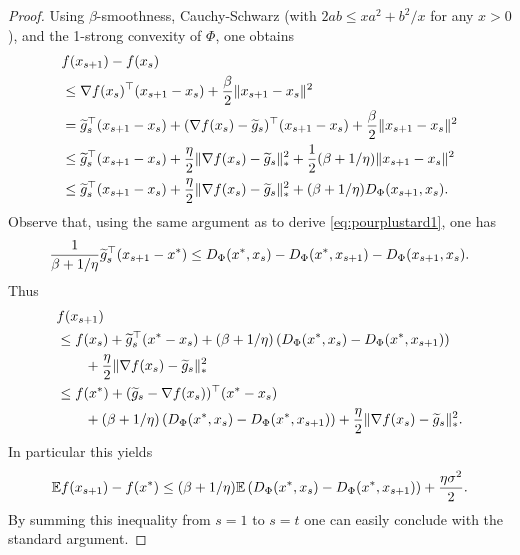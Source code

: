\begin{proof}
Using $\beta$-smoothness, Cauchy-Schwarz (with $2 ab \leq x a^2+ b^2 / x$ for any $x >0$), and the 1-strong convexity of $\Phi$, one obtains
\begin{align*}
& f(x_{s+1}) - f(x_s) \\
& \leq \nabla f(x_s)^{\top} (x_{s+1} - x_s) + \frac{\beta}{2} \|x_{s+1} - x_s\|^2 \\
& = \widetilde{g}_s^{\top} (x_{s+1} - x_s) + (\nabla f(x_s) - \widetilde{g}_s)^{\top} (x_{s+1} - x_s) + \frac{\beta}{2} \|x_{s+1} - x_s\|^2 \\
& \leq \widetilde{g}_s^{\top} (x_{s+1} - x_s) + \frac{\eta}{2} \|\nabla f(x_s) - \widetilde{g}_s\|_*^2 + \frac12 (\beta + 1/\eta) \|x_{s+1} - x_s\|^2 \\
& \leq \widetilde{g}_s^{\top} (x_{s+1} - x_s) + \frac{\eta}{2} \|\nabla f(x_s) - \widetilde{g}_s\|_*^2 + (\beta + 1/\eta) D_{\Phi}(x_{s+1}, x_s) .
\end{align*}
Observe that, using the same argument as to derive \eqref{eq:pourplustard1}, one has
$$\frac{1}{\beta + 1/\eta} \widetilde{g}_s^{\top} (x_{s+1} - x^*) \leq D_{\Phi} (x^*, x_s) - D_{\Phi}(x^*, x_{s+1}) - D_{\Phi}(x_{s+1}, x_s) .$$
Thus
\begin{align*}
& f(x_{s+1}) \\
 & \leq f(x_s) + \widetilde{g}_s^{\top}(x^* - x_s) + (\beta + 1/\eta) \left(D_{\Phi} (x^*, x_s) - D_{\Phi}(x^*, x_{s+1})\right) \\
& \qquad + \frac{\eta}{2} \|\nabla f(x_s) - \widetilde{g}_s\|_*^2 \\
& \leq f(x^*) + (\widetilde{g}_s-\nabla f(x_s))^{\top}(x^* - x_s) \\
& \qquad + (\beta + 1/\eta) \left(D_{\Phi} (x^*, x_s) - D_{\Phi}(x^*, x_{s+1})\right) + \frac{\eta}{2} \|\nabla f(x_s) - \widetilde{g}_s\|_*^2 .
\end{align*}
In particular this yields
$$\mathbb{E} f(x_{s+1}) - f(x^*) \leq (\beta + 1/\eta) \mathbb{E} \left(D_{\Phi} (x^*, x_s) - D_{\Phi}(x^*, x_{s+1})\right) + \frac{\eta \sigma^2}{2} .$$
By summing this inequality from $s=1$ to $s=t$ one can easily conclude with the standard argument.
\end{proof}

